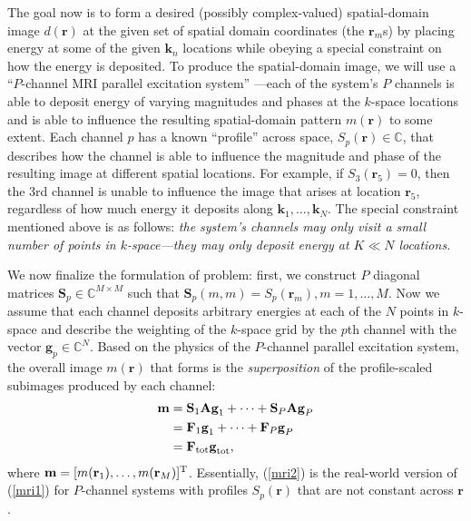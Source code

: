 \documentclass[final]{siamltex}
\newcommand{\field}[1]{\mathbb{#1}}
\newcommand{\la}[1]{\mbox{$\mathbf{#1}$}}  \newcommand{\sst}[1]{\mbox{\scriptsize{#1}}}
\begin{document}
   The goal now is to form a desired (possibly complex-valued)
   spatial-domain image $d(\la{r})$ at the given set of spatial domain
   coordinates (the $\la{r}_m$s) by placing energy at some of the
   given $\la{k}_n$ locations while obeying a special constraint on
   how the energy is deposited.  To produce the spatial-domain image,
   we will use a ``$P$-channel MRI parallel excitation system''
   \cite{Kat2003, Set2006}---each of the system's $P$ channels is able
   to deposit energy of varying magnitudes and phases at the $k$-space
   locations and is able to influence the resulting spatial-domain
   pattern $m(\la{r})$ to some extent. Each channel $p$ has a known
   ``profile'' across space, $S_p(\la{r}) \in \field{C}$, that
   describes how the channel is able to influence the magnitude and
   phase of the resulting image at different spatial locations.  For
   example, if $S_3(\la{r}_5) = 0$, then the 3rd channel is unable to
   influence the image that arises at location $\la{r}_5$, regardless
   of how much energy it deposits along $\la{k}_1, \ldots, \la{k}_N$.
   The special constraint mentioned above is as follows: {\em{the
   system's channels may only visit a small number of points in
   $k$-space---they may only deposit energy at $K \ll N$ locations.}}

   We now finalize the formulation of problem: first, we construct $P$
   diagonal matrices $\la{S}_p \in \field{C}^{M \times M}$ such that
   $\la{S}_p(m,m) = S_p(\la{r}_m), m = 1, \ldots, M$.  Now we assume that each channel
   deposits arbitrary energies at each of the $N$ points in $k$-space
   and describe the weighting of the $k$-space grid by the $p$th channel with the vector
   $\la{g}_p \in \field{C}^{N}$.  Based on the physics of the
   $P$-channel parallel excitation system, the overall image
   $m(\la{r})$ that forms is the {\em{superposition}} of the
   profile-scaled subimages produced by each channel:
   \begin{equation}\label{mri2}
   \begin{split}
      \la{m} & = \la{S}_1 \la{A} \la{g}_1 + \cdots + \la{S}_P \la{A} \la{g}_P \\
             & = \la{F}_1 \la{g}_1 + \cdots + \la{F}_P \la{g}_P \\
             & = \la{F}_{\sst{tot}} \la{g}_{\sst{tot}},
   \end{split}
   \end{equation}
   where $\la{m} = [m(\la{r}_1), \ldots, m(\la{r}_M)]^{\sst{T}}$.
   Essentially, (\ref{mri2}) is the real-world version of (\ref{mri1})
   for $P$-channel systems with profiles $S_p(\la{r})$ that are
   not constant across \la{r}.
\end{document}
